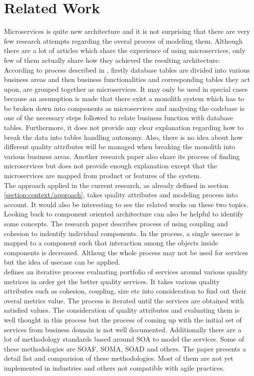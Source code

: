 \chapter{Related Work}\label{chapter:related_work}
Microservices is quite new architecture and it is not surprising that there are very few research attempts regarding the overal process of modeling them. Although there are a lot of articles which share the experience of using microservices, only few of them actually share how they achieved the resulting architecture. According to process described in \cite{Levcovitz:2014aa}, firstly database tables are divided into various business areas and then business functionalities and corresponding tables they act upon, are grouped together as microservices. It may only be used in special cases because an assumption is made that there exist a monolith system which has to be broken down into components as microservices and analysing the codebase is one of the necessary steps followed to relate business function with database tables. Furthermore, it does not provide any clear explanation regarding how to break the data into tables handling autonomy. Also, there is no idea about how different quality attributes will be managed when breaking the monolith into various business areas. Another research paper \cite{Bruggemann:2013aa} also share its process of finding microservices but does not provide enough explanation except that the microservices are mapped from product or features of the system.
\\
The approach applied in the current research, as already defined in section \ref{section:context/approach}, takes quality attributes and modeling process into account. It would also be interesting to see the related works on these two topics.\\
Looking back to component oriented architecture can also be helpful to identify some concepts. The research paper \cite{Lee:2001aa} describes process of using coupling and cohesion to indentify individual components. In the process, a single usecase is mapped to a component such that interaction among the objects inside components is decreased. Althoug the whole process may not be used for services but the idea of usecase can be applied.\\
\cite{Ma:2009aa} defines an iterative process evaluating portfolio of services around various quality metrices in order get the better quality services. It takes various quality attributes such as cohesion, coupling, size etc into consideration to find out their overal metrics value. The process is iterated until the services are obtained with satisfied values. The consideration of quality attributes and evaluating them is well thought in this process but the process of coming up with the initial set of services from business domain is not well documented.
Additionally there are a lot of methodology standards based around \acrshort{SOA} to model the services. Some of these methodologies are \acrshort{SOAF}, \acrshort{SOMA}, \acrshort{SOAD} and others. The paper \cite{Ramollari:2016aa} presents a detail list and comparision of these methodologies. Most of them are not yet implemented in industries and others not compatible with agile practices.